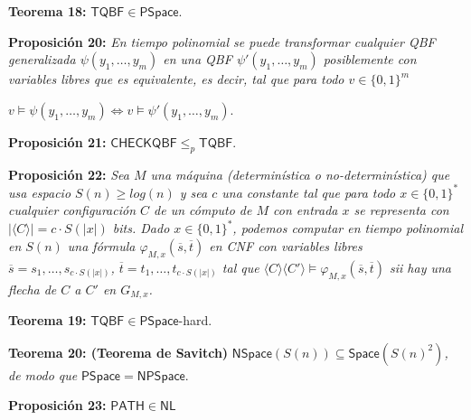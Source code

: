 \documentclass{article}
\begin{document}
\begin{flushleft}
  \textbf{Teorema 18:}
  $\mathsf{TQBF} \in \mathsf{PSpace}$.
\end{flushleft}

\begin{flushleft}
  \textbf{Proposición 20:}
  \textit{En tiempo polinomial se puede transformar cualquier QBF generalizada $\psi (y_1, \dots, y_m)$ 
  en una QBF $\psi'(y_1, \dots, y_m)$ posiblemente con variables libres que es equivalente, es decir, tal 
  que para todo $v \in \{ 0,1 \}^m$}
\end{flushleft}
\begin{center}
  $v \models \psi(y_1, \dots, y_m) \iff v \models \psi'(y_1, \dots, y_m)$.
\end{center}

\begin{flushleft}
  \textbf{Proposición 21:}
  $\mathsf{CHECKQBF} \leq_p \mathsf{TQBF}$.
\end{flushleft}

\begin{flushleft}
  \textbf{Proposición 22:}
  \textit{Sea $M$ una máquina (determinística o no-determinística) que usa espacio $S(n) \geq log(n)$ y sea
  $c$ una constante tal que para todo $x \in \{0,1\}^*$ cualquier configuración $C$ de un cómputo de $M$ con
  entrada $x$ se representa con $|\langle C \rangle| = c \cdot S(|x|)$ bits. Dado $x \in \{0,1\}^*$, podemos
  computar en tiempo polinomial en $S(n)$ una fórmula $\varphi_{M,x}(\overline{s}, \overline{t})$ en CNF con
  variables libres $\overline{s} = s_1, \dots, s_{c \cdot S(|x|)}$, $\overline{t} = t_1, \dots, t_{c \cdot
  S(|x|)}$ tal que $\langle C \rangle \langle C' \rangle \models \varphi_{M,x}(\overline{s}, \overline{t})$
  sii hay una flecha de $C$ a $C'$ en $G_{M,x}$.}
\end{flushleft}

\begin{flushleft}
  \textbf{Teorema 19:}
  $\mathsf{TQBF} \in \mathsf{PSpace}$-hard.
\end{flushleft}

\begin{flushleft}
  \textbf{Teorema 20: \hypertarget{savitch}{\textcolor{Bittersweet}{(Teorema de Savitch)}}}
  $\mathsf{NSpace}(S(n)) \subseteq \mathsf{Space}(S(n)^2)$\textit{, de modo que} $\mathsf{PSpace} = \mathsf{
  NPSpace}$.
\end{flushleft}

\begin{flushleft}
  \textbf{Proposición 23:}
  $\mathsf{PATH} \in \mathsf{NL}$
\end{flushleft}
\end{document}
